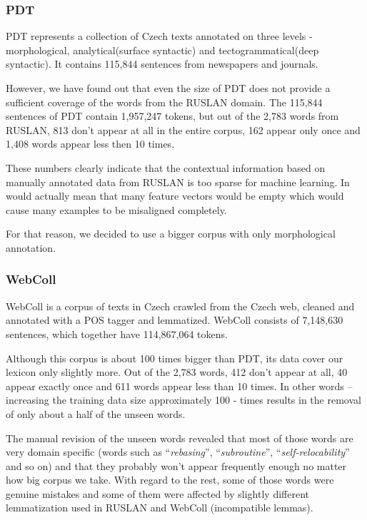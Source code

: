 \documentclass[letterpaper]{article}
\begin{document}
\subsubsection{PDT}
PDT 
represents a collection of Czech texts annotated on three
levels - morphological, analytical(surface syntactic) and tectogrammatical(deep syntactic). It   
contains 115,844 sentences from newspapers and journals.

However, we have found out that even the size of PDT does not provide a sufficient coverage of the words from the RUSLAN domain. 
The 115,844 sentences of PDT contain 1,957,247 tokens, but out of the 2,783 words from RUSLAN, 813 don't appear at all in the entire corpus, 162 appear only once and 
1,408 words appear less then 10 times.

These numbers clearly indicate that the contextual information based on manually annotated data from RUSLAN is too sparse for machine learning. In would actually mean that many feature vectors would be empty 
which would cause 
many examples to be misaligned completely.

For that reason, we decided to use a bigger corpus with only morphological annotation.

\subsubsection{WebColl}

WebColl\cite{webcoll} is a corpus of texts in Czech crawled from the Czech web, cleaned and annotated  with a POS tagger and lemmatized.
WebColl consists of 7,148,630 sentences, which together have 114,867,064 tokens. 

Although this corpus is about 100 times bigger than PDT, its data cover our lexicon only slightly more. Out of the 2,783 words, 412 don't appear at all, 
40 appear exactly once and 611 words appear less than 10 times. In other words -- increasing the training data size approximately 100 - times results in the removal of only about a half of the unseen words.

The manual revision of the unseen words revealed that most of those words are very domain specific 
(words such as ``\emph{rebasing}'', ``\emph{subroutine}'', ``\emph{self-relocability}'' and so on) 
and that they probably won't appear frequently enough no matter how big corpus we take. With regard to the rest, some of those words were genuine mistakes and some of them were affected by slightly different lemmatization used in RUSLAN and WebColl (incompatible lemmas).
\end{document}
